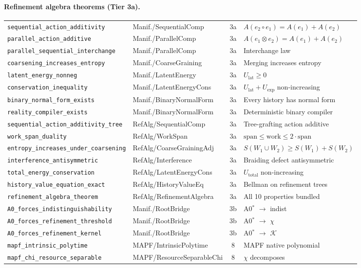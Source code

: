 \paragraph{Refinement algebra theorems (Tier 3a).}
\begin{center}
\small
\begin{tabular}{@{}llcp{4.5cm}@{}}
\hline
\texttt{sequential\_action\_additivity} & Manif./SequentialComp & 3a & $A(e_2 \circ e_1) = A(e_1) + A(e_2)$ \\
\texttt{parallel\_action\_additive} & Manif./ParallelComp & 3a & $A(e_1 \otimes e_2) = A(e_1) + A(e_2)$ \\
\texttt{parallel\_sequential\_interchange} & Manif./ParallelComp & 3a & Interchange law \\
\texttt{coarsening\_increases\_entropy} & Manif./CoarseGraining & 3a & Merging increases entropy \\
\texttt{latent\_energy\_nonneg} & Manif./LatentEnergy & 3a & $U_{\mathrm{lat}} \geq 0$ \\
\texttt{conservation\_inequality} & Manif./LatentEnergyCons & 3a & $U_{\mathrm{lat}} + U_{\mathrm{exp}}$ non-increasing \\
\texttt{binary\_normal\_form\_exists} & Manif./BinaryNormalForm & 3a & Every history has normal form \\
\texttt{reality\_compiler\_exists} & Manif./BinaryNormalForm & 3a & Deterministic binary compiler \\
\texttt{sequential\_action\_additivity\_tree} & RefAlg/SequentialComp & 3a & Tree-grafting action additive \\
\texttt{work\_span\_duality} & RefAlg/WorkSpan & 3a & $\mathrm{span} \leq \mathrm{work} \leq 2 \cdot \mathrm{span}$ \\
\texttt{entropy\_increases\_under\_coarsening} & RefAlg/CoarseGrainingAdj & 3a & $S(W_1 \cup W_2) \geq S(W_1)+S(W_2)$ \\
\texttt{interference\_antisymmetric} & RefAlg/Interference & 3a & Braiding defect antisymmetric \\
\texttt{total\_energy\_conservation} & RefAlg/LatentEnergyCons & 3a & $U_{\mathrm{total}}$ non-increasing \\
\texttt{history\_value\_equation\_exact} & RefAlg/HistoryValueEq & 3a & Bellman on refinement trees \\
\texttt{refinement\_algebra\_theorem} & RefAlg/RefinementAlgebra & 3a & All 10 properties bundled \\
\texttt{A0\_forces\_indistinguishability} & Manif./RootBridge & 3b & A0$^*$ $\to$ indist \\
\texttt{A0\_forces\_refinement\_threshold} & Manif./RootBridge & 3b & A0$^*$ $\to$ $\chi$ \\
\texttt{A0\_forces\_refinement\_kernel} & Manif./RootBridge & 3b & A0$^*$ $\to$ $\mathcal{K}$ \\
\texttt{mapf\_intrinsic\_polytime} & MAPF/IntrinsicPolytime & 8 & MAPF native polynomial \\
\texttt{mapf\_chi\_resource\_separable} & MAPF/ResourceSeparableChi & 8 & $\chi$ decomposes \\
\hline
\end{tabular}
\end{center}
